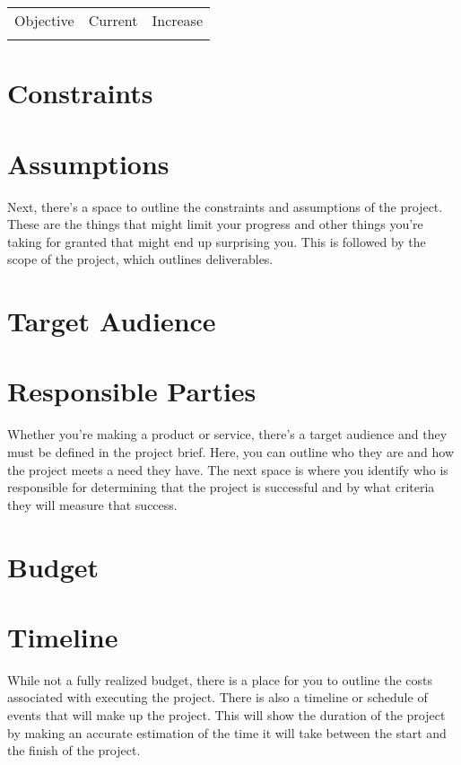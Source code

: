 \documentclass[11pt]{article}
\begin{document}
\begin{center}
\begin{tabular}{lll}
Objective & Current & Increase\\
 &  & \\
\end{tabular}
\end{center}


\section{Constraints}
\label{sec:org6eebe3a}

\section{Assumptions}
\label{sec:org68761fb}

Next, there’s a space to outline the constraints and assumptions of the project. These are the things that might limit your progress and other things you’re taking for granted that might end up surprising you. This is followed by the scope of the project, which outlines deliverables.

\section{Target Audience}
\label{sec:org97d93c0}

\section{Responsible Parties}
\label{sec:org3dedd01}

Whether you’re making a product or service, there’s a target audience and they must be defined in the project brief. Here, you can outline who they are and how the project meets a need they have. The next space is where you identify who is responsible for determining that the project is successful and by what criteria they will measure that success.

\section{Budget}
\label{sec:org224a270}

\section{Timeline}
\label{sec:orgbf0c383}

While not a fully realized budget, there is a place for you to outline the costs associated with executing the project. There is also a timeline or schedule of events that will make up the project. This will show the duration of the project by making an accurate estimation of the time it will take between the start and the finish of the project.
\end{document}
